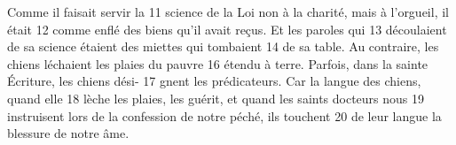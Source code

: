 Comme il faisait servir la	 
11	 	science de la Loi non à la charité, mais à l'orgueil, il était	 
12	 	comme enflé des biens qu'il avait reçus. Et les paroles qui	 
13	 	découlaient de sa science étaient des miettes qui tombaient	 
14	 	de sa table.
	Au contraire, les chiens léchaient les plaies du pauvre	 
16	 	étendu à terre. Parfois, dans la sainte Écriture, les chiens dési-	 
17	 	gnent les prédicateurs. Car la langue des chiens, quand elle	 
18	 	lèche les plaies, les guérit, et quand les saints docteurs nous	 
19	 	instruisent lors de la confession de notre péché, ils touchent	 
20	 	de leur langue la blessure de notre âme.